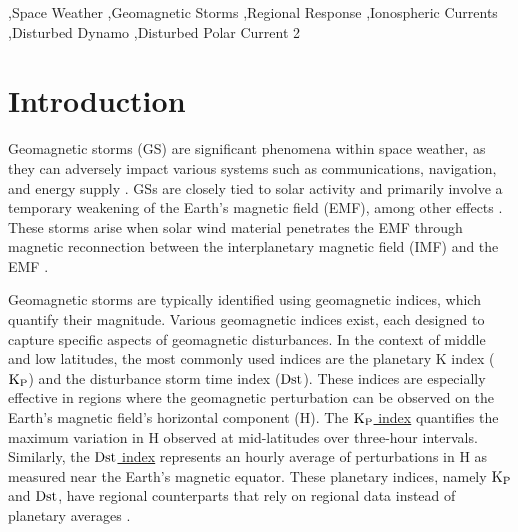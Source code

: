 \documentclass[a4paper,fleqn]{cas-dc}
\begin{document}
\begin{keywords}
 \sep Space Weather \sep Geomagnetic Storms \sep Regional Response \sep Ionospheric Currents \sep Disturbed Dynamo \sep Disturbed Polar Current 2  
\end{keywords}

\maketitle
\section{Introduction}
     \label{S-Introduction} 



Geomagnetic storms (GS) are significant phenomena within space weather, as they can adversely impact various systems such as communications, navigation, and energy supply \citep{schrijver2015}. GSs are closely tied to solar activity and primarily involve a temporary weakening of the Earth's magnetic field (EMF), among other effects \citep{gonzalestgm}. These storms arise when solar wind material penetrates the EMF through magnetic reconnection between the interplanetary magnetic field (IMF) and the EMF \citep{l_basic_spaceplasmaphysic, l_russell}.

Geomagnetic storms are typically identified using geomagnetic indices, which quantify their magnitude. Various geomagnetic indices exist, each designed to capture specific aspects of geomagnetic disturbances. In the context of middle and low latitudes, the most commonly used indices are the planetary K index (${\rm K_P}$) and the disturbance storm time index (${\rm Dst}$). These indices are especially effective in regions where the geomagnetic perturbation can be observed on the Earth's magnetic field's horizontal component (H). The \href{https://www.gfz-potsdam.de/en/section/geomagnetism/data-products-services/geomagnetic-kp-index}{${\rm K_P}$ index} quantifies the maximum variation in H observed at mid-latitudes over three-hour intervals. Similarly, the \href{https://wdc.kugi.kyoto-u.ac.jp/dstae/index.html}{${\rm Dst}$ index} represents an hourly average of perturbations in H as measured near the Earth's magnetic equator. These planetary indices, namely ${\rm K_P}$ and ${\rm Dst}$, have regional counterparts that rely on regional data instead of planetary averages \citep{mayaud1980}.
\end{document}
